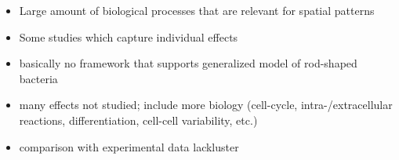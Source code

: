 \begin{itemize}
    \item Large amount of biological processes that are relevant for spatial patterns
    \item Some studies which capture individual effects
    \item basically no framework that supports generalized model of rod-shaped bacteria
    \item many effects not studied; include more biology (cell-cycle, intra-/extracellular
        reactions, differentiation, cell-cell variability, etc.)
    \item comparison with experimental data lackluster
\end{itemize}

